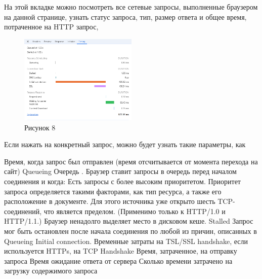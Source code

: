 \documentclass[12pt]{article}
\begin{document}
На этой вкладке можно посмотреть все сетевые запросы, выполненные браузером на данной странице, узнать статус запроса, тип, размер ответа и общее время, потраченное на HTTP запрос,
\begin{figure}[h!]
\centering
\includegraphics[width=0.5\textwidth]{../images/network__timing.png}
\caption{Рисунок 8}
\end{figure}

Если нажать на конкретный запрос, можно будет узнать такие параметры, как

Время, когда запрос был отправлен (время отсчитывается от момента перехода на сайт)
Queueing Очередь . Браузер ставит запросы в очередь перед началом соединения и когда:
Есть запросы с более высоким приоритетом. Приоритет запроса определяется такими факторами, как тип ресурса, а также его расположение в документе.
Для этого источника уже открыто шесть TCP-соединений, что является пределом. (Применимо только к HTTP/1.0 и HTTP/1.1.)
Браузер ненадолго выделяет место в дисковом кеше.
Stalled Запрос мог быть остановлен после начала соединения по любой из причин, описанных в Queueing
Initial connection. Временные затраты на TSL/SSL handshake, если используется HTTPs, на TCP Handshake
Время, затраченное, на отправку запроса
Время ожидание ответа от сервера
Сколько времени затрачено на загрузку содержимого запроса
\end{document}
